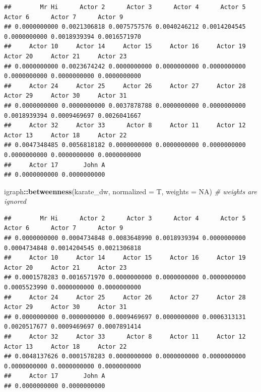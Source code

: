 \documentclass[
]{book}
\newenvironment{Shaded}{\begin{snugshade}}{\end{snugshade}}
\newcommand{\AttributeTok}[1]{\textcolor[rgb]{0.13,0.29,0.53}{#1}}
\newcommand{\CommentTok}[1]{\textcolor[rgb]{0.56,0.35,0.01}{\textit{#1}}}
\newcommand{\ConstantTok}[1]{\textcolor[rgb]{0.56,0.35,0.01}{#1}}
\newcommand{\FunctionTok}[1]{\textcolor[rgb]{0.13,0.29,0.53}{\textbf{#1}}}
\newcommand{\NormalTok}[1]{#1}
\newcommand{\SpecialCharTok}[1]{\textcolor[rgb]{0.81,0.36,0.00}{\textbf{#1}}}
\begin{document}
\begin{verbatim}
##        Mr Hi      Actor 2      Actor 3      Actor 4      Actor 5      Actor 6      Actor 7      Actor 9 
## 0.0000000000 0.0021306818 0.0075757576 0.0040246212 0.0014204545 0.0000000000 0.0018939394 0.0016571970 
##     Actor 10     Actor 14     Actor 15     Actor 16     Actor 19     Actor 20     Actor 21     Actor 23 
## 0.0000000000 0.0023674242 0.0000000000 0.0000000000 0.0000000000 0.0000000000 0.0000000000 0.0000000000 
##     Actor 24     Actor 25     Actor 26     Actor 27     Actor 28     Actor 29     Actor 30     Actor 31 
## 0.0000000000 0.0000000000 0.0037878788 0.0000000000 0.0000000000 0.0018939394 0.0009469697 0.0026041667 
##     Actor 32     Actor 33      Actor 8     Actor 11     Actor 12     Actor 13     Actor 18     Actor 22 
## 0.0047348485 0.0056818182 0.0000000000 0.0000000000 0.0000000000 0.0000000000 0.0000000000 0.0000000000 
##     Actor 17       John A 
## 0.0000000000 0.0000000000
\end{verbatim}

\begin{Shaded}
\begin{Highlighting}[]
\NormalTok{igraph}\SpecialCharTok{::}\FunctionTok{betweenness}\NormalTok{(karate\_dw, }\AttributeTok{normalized =}\NormalTok{ T, }\AttributeTok{weights =} \ConstantTok{NA}\NormalTok{) }\CommentTok{\# weights are ignored}
\end{Highlighting}
\end{Shaded}

\begin{verbatim}
##        Mr Hi      Actor 2      Actor 3      Actor 4      Actor 5      Actor 6      Actor 7      Actor 9 
## 0.0000000000 0.0004734848 0.0083648990 0.0018939394 0.0000000000 0.0004734848 0.0014204545 0.0021306818 
##     Actor 10     Actor 14     Actor 15     Actor 16     Actor 19     Actor 20     Actor 21     Actor 23 
## 0.0001578283 0.0016571970 0.0000000000 0.0000000000 0.0000000000 0.0005523990 0.0000000000 0.0000000000 
##     Actor 24     Actor 25     Actor 26     Actor 27     Actor 28     Actor 29     Actor 30     Actor 31 
## 0.0000000000 0.0000000000 0.0009469697 0.0000000000 0.0006313131 0.0020517677 0.0009469697 0.0007891414 
##     Actor 32     Actor 33      Actor 8     Actor 11     Actor 12     Actor 13     Actor 18     Actor 22 
## 0.0048137626 0.0001578283 0.0000000000 0.0000000000 0.0000000000 0.0000000000 0.0000000000 0.0000000000 
##     Actor 17       John A 
## 0.0000000000 0.0000000000
\end{verbatim}
\end{document}
